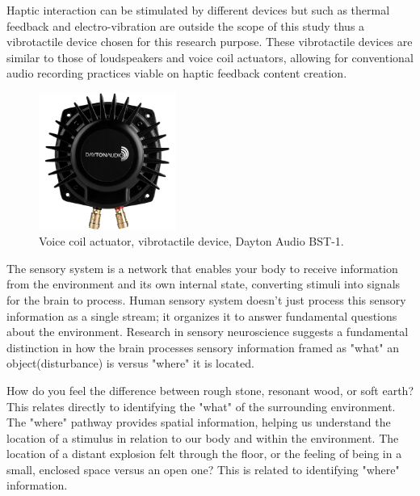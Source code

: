             Haptic interaction can be stimulated by different devices but such as thermal feedback and electro-vibration are outside the scope of this study thus a vibrotactile device chosen for this research purpose. These vibrotactile devices are similar to those of loudspeakers and voice coil actuators\cite{Blank}, allowing for conventional audio recording practices viable on haptic feedback content creation.\par

            \begin{figure}[H]
                \centering
                \includegraphics[width=0.4\textwidth]{images/vibrotactile_bass-shaker.jpg}
                \caption{Voice coil actuator, vibrotactile device, Dayton Audio BST-1.}
                \label{fig:VCA}
            \end{figure}

            The sensory system is a network that enables your body to receive information from the environment and its own internal state, converting stimuli into signals for the brain to process. Human sensory system doesn't just process this sensory information as a single stream; it organizes it to answer fundamental questions about the environment\cite{Blank}. Research in sensory neuroscience suggests a fundamental distinction in how the brain processes sensory information framed as "what" an object(disturbance) is versus "where" it is located.\par

            How do you feel the difference between rough stone, resonant wood, or soft earth? This relates directly to identifying the "what" of the surrounding environment. The "where" pathway provides spatial information, helping us understand the location of a stimulus in relation to our body and within the environment. The location of a distant explosion felt through the floor, or the feeling of being in a small, enclosed space versus an open one? This is related to identifying "where" information.\par

